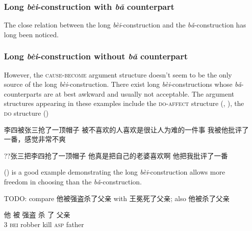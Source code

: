 \documentclass[UTF8, a4paper, oneside, scheme=plain, 12pt]{ctexrep}
\newcommand{\form}[1]{\emph{#1}}
\newcommand*{\category}[1]{\textsc{#1}}
\begin{document}
\subsubsection{Long \form{bèi}-construction with \form{bǎ} counterpart}
\label{sec:verb-phrase.bei.ba}

The close relation between the long \form{bèi}-construction 
and the \form{bǎ}-construction
has long been noticed.

\subsubsection{Long \form{bèi}-construction without \form{bǎ} counterpart}
\label{sec:verb-phrase.bei.no-ba}

However, the \category{cause}-\category{become} argument structure
doesn't seem to be the only source of the long \form{bèi}-construction.
There exist long \form{bèi}-constructions whose \form{bǎ}-counterparts 
are at best awkward and usually not acceptable.
The argument structures appearing in these examples 
include the \category{do}-\category{affect} structure 
(, 
),
the \category{do} structure 
()

\begin{exe}
    \ex\label{ex:verb-phrase.long-bei.no-ba.1} 李四被张三抢了一顶帽子
    \ex\label{ex:verb-phrase.long-bei.no-ba.2} 被不喜欢的人喜欢是很让人为难的一件事
    \ex 我被他批评了一番，感觉非常不爽
\end{exe}

\begin{exe}
    \ex ??张三把李四抢了一顶帽子
    \ex *他真是把自己的老婆喜欢啊
    \ex 他把我批评了一番
\end{exe}

() is a good example 
demonstrating the long \form{bèi}-construction
allows more freedom in choosing 
than the \form{bǎ}-construction.

TODO: compare 他被强盗杀了父亲 with 王冕死了父亲; also 他被杀了父亲

\begin{exe}
    \ex\label{ex:verb-phrase.long-bei.external-possession-1} \gll 他 被 强盗 杀 了 父亲 \\
    3 \category{bei} robber kill \category{asp} father \\
\end{exe}
\end{document}
